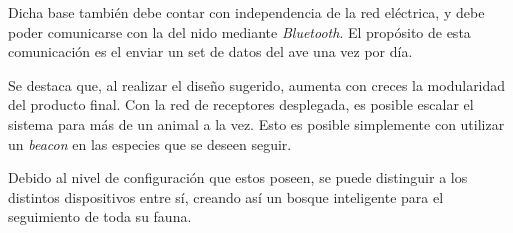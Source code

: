 Dicha base también debe contar con independencia de la red eléctrica, y debe poder comunicarse con la del nido mediante \textit{Bluetooth}. El propósito de esta comunicación es el enviar un set de datos del ave una vez por día.

Se destaca que, al realizar el diseño sugerido, aumenta con creces la modularidad del producto final. Con la red de receptores desplegada, es posible escalar el sistema para más de un animal a la vez. Esto es posible simplemente con utilizar un \textit{beacon} en las especies que se deseen seguir. 

Debido al nivel de configuración que estos poseen, se puede distinguir a los distintos dispositivos entre sí, creando así un bosque inteligente para el seguimiento de toda su fauna.
